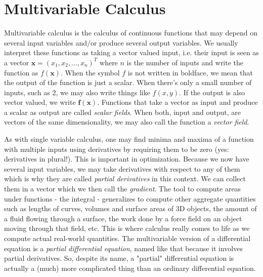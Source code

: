 \chapter{Multivariable Calculus}
Multivariable calculus is the calculus of continuous functions that may depend on several input variables and/or produce several output variables. We usually interpret these functions as taking a vector valued input, i.e. their input is seen as a vector  $\mathbf{x} = (x_1,x_2,\ldots,x_n)^T$ where $n$ is the number of inputs and write the function as $f(\mathbf{x})$. When the symbol $f$ is not written in boldface, we mean that the output of the function is just a scalar. When there's only a small number of inputs, such as 2, we may also write things like $f(x,y)$. If the output is also vector valued, we write $\mathbf{f(x)}$. Functions that take a vector as input and produce a scalar as output are called \emph{scalar fields}. When both, input and output, are vectors of the same dimensionality, we may also call the function a \emph{vector field}.

\medskip
As with single variable calculus, one may find minima and maxima of a function with multiple inputs using derivatives by requiring them to be zero (yes: derivatives in plural!). This is important in optimization. Because we now have several input variables, we may take derivatives with respect to any of them which is why they are called \emph{partial derivatives} in this context. We can collect them in a vector which we then call the \emph{gradient}. The tool to compute areas under functions - the integral - generalizes to compute other aggregate quantities such as lengths of curves, volumes and surface areas of 3D objects, the amount of a fluid flowing through a surface, the work done by a force field on an object moving through that field, etc. This is where calculus really comes to life as we compute actual real-world quantities. The multivariable version of a differential equation is a \emph{partial differential equation}, named like that because it involves partial derivatives. So, despite its name, a "partial" differential equation is actually a (much) more complicated thing than an ordinary differential equation. 

